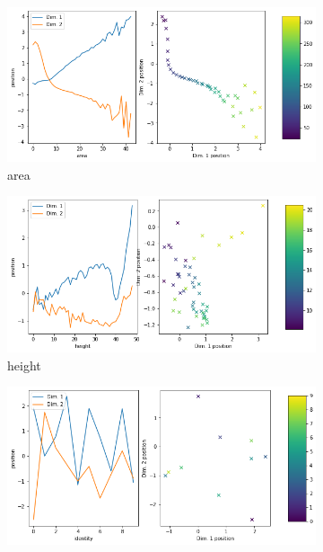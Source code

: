 \documentclass[11pt,a4paper]{article}
\begin{document}
\begin{figure}[H]
\centering
\begin{subfigure}{.48\textwidth}
\includegraphics[width=\textwidth]{images/latent_space_traversals/vae_gan_mnist_morpho_latent_space_values_area.png}
\caption{area}
\end{subfigure}
\hfill
\begin{subfigure}{.48\textwidth}
\includegraphics[width=\textwidth]{images/latent_space_traversals/vae_gan_mnist_morpho_latent_space_values_height.png}
\caption{height}
\end{subfigure}
\begin{subfigure}{.48\textwidth}
\includegraphics[width=\textwidth]{images/latent_space_traversals/vae_gan_mnist_morpho_latent_space_values_identity.png}

\end{subfigure}
\end{figure}
\end{document}
